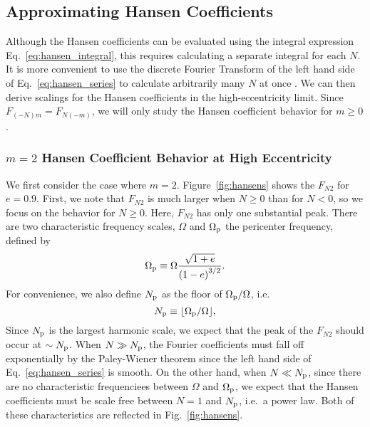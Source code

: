 \documentclass[
        fleqn,
        usenatbib,
    ]{mnras}
\newcommand*{\p}[1]{\left(#1\right)}
\begin{document}
\subsection{Approximating Hansen Coefficients}\label{ss:hansens}

Although the Hansen coefficients can be evaluated using the integral expression
Eq.~\eqref{eq:hansen_integral}, this requires calculating a separate integral
for each $N$. It is more convenient to use the discrete Fourier Transform of the
left hand side of Eq.~\eqref{eq:hansen_series} to calculate arbitrarily many $N$
at once \citep[as pointed out by][]{correia2014deformation}. We can then derive
scalings for the Hansen coefficients in the high-eccentricity limit. Since
$F_{(-N)m} = F_{N(-m)}$, we will only study the Hansen coefficient behavior for
$m \geq 0$.

\subsubsection{$m=2$ Hansen Coefficient Behavior at High Eccentricity}

We first consider the case where $m = 2$. Figure~\ref{fig:hansens} shows
the $F_{N2}$ for $e = 0.9$. First, we note that $F_{N2}$ is much larger when $N
\geq 0$ than for $N < 0$, so we focus on the behavior for $N \geq 0$. Here,
$F_{N2}$ has only one substantial peak. There are two characteristic frequency
scales, $\Omega$ and $\Omega_{\rm p}$ the pericenter frequency, defined by
\begin{equation}
    \Omega_{\rm p} \equiv \Omega \frac{\sqrt{1 + e}}{\p{1 - e}^{3/2}}.
        \label{eq:Wperi}
\end{equation}
For convenience, we also define $N_{\rm p}$ as the floor of $\Omega_{\rm p} /
\Omega$, i.e.
\begin{equation}
    N_{\rm p} \equiv \lfloor \Omega_{\rm p} / \Omega\rfloor,
\end{equation}
Since $N_{\rm p}$ is the largest harmonic scale, we expect that the peak of the
$F_{N2}$ should occur at $\sim N_{\rm p}$. When $N \gg N_{\rm p}$, the Fourier
coefficients must fall off exponentially by the Paley-Wiener theorem since the
left hand side of Eq.~\eqref{eq:hansen_series} is smooth. On the other hand,
when $N \ll N_{\rm p}$, since there are no characteristic frequenciees between
$\Omega$ and $\Omega_{\rm p}$, we expect that the Hansen coefficients must be
scale free between $N = 1$ and $N_{\rm p}$, i.e.\ a power law. Both of these
characteristics are reflected in Fig.~\ref{fig:hansens}.
\end{document}

